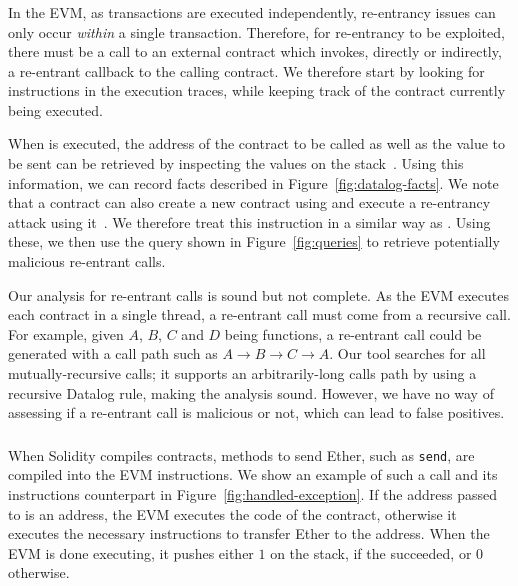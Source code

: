 


\subsubsection{\reentrancy}
In the EVM, as transactions are executed independently, re-entrancy issues can only occur \emph{within} a single transaction. Therefore, for re-entrancy to be exploited, there must be a call to an external contract which invokes, directly or indirectly, a re-entrant callback to the calling contract. We therefore start by looking for  instructions in the execution traces, while keeping track of the contract currently being executed.

When  is executed, the address of the contract to be called as well as the value to be sent can be retrieved by inspecting the values on the stack~\cite{wood2014ethereum}. Using this information, we can record  facts described in Figure~\ref{fig:datalog-facts}.
We note that a contract can also create a new contract using  and execute a re-entrancy attack using it~\cite{Rodler2019}. We therefore treat this instruction in a similar way as .
Using these, we then use the query shown in Figure~\ref{fig:queries} to retrieve potentially malicious re-entrant calls.

\correctness Our analysis for re-entrant calls is sound but not complete. As the EVM executes each contract in a single thread, a re-entrant call must come from a recursive call. For example, given $A$, $B$, $C$ and $D$ being functions, a re-entrant call could be generated with a call path such as $A\rightarrow B \rightarrow C\rightarrow A$. Our tool searches for all mutually-recursive calls; it supports an arbitrarily-long calls path by using a recursive Datalog rule, making the analysis sound. However, we have no way of assessing if a re-entrant call is malicious or not, which can lead to false positives.

\subsubsection{\unhandledexceptions}
%
When Solidity compiles contracts, methods to send Ether, such as \lstinline{send}, are compiled into the EVM  instructions. We show an example of such a call and its instructions counterpart in Figure~\ref{fig:handled-exception}. If the address passed to  is an address, the EVM executes the code of the contract, otherwise it executes the necessary instructions to transfer Ether to the address. When the EVM is done executing, it pushes either $1$ on the stack, if the  succeeded, or $0$ otherwise. 

